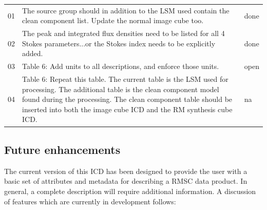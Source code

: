 \documentclass[a4paper,10pt,bibtotoc]{scrartcl}
\begin{document}
\begin{center}
 \tablelasttail{\hline}
 \begin{supertabular}{lp{12.8cm}l}
   01 & The source group should in addition to the LSM used contain the clean component list.  Update the normal image cube too. & done \\
   02 & The peak and integrated flux densities need to be listed for all 4 Stokes parameters...or the Stokes index needs to be explicitly added. & done \\
   03 & Table 6:  Add units to all descriptions, and enforce those units. & open \\
   04 & Table 6:  Repeat this table.  The current table is the LSM used for processing.  The additional table is the clean component model found during the processing.  The clean component table should be inserted  into both the image cube ICD and the RM synthesis cube ICD. & na \\
 \end{supertabular}
\end{center}

\subsection{Future enhancements}
\label{sec:future-enhancements}

The current version of this ICD has been designed to provide the user with a basic set of attributes and metadata for describing a RMSC data product.  In general, a complete description will require additional information.  A discussion of features which are currently in development follows:
\end{document}
